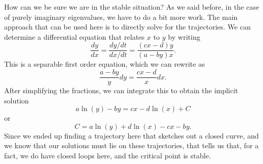 \documentclass{ximera}
\begin{document}
How can we be sure we are in the stable situation? As we said before, in the case of purely imaginary eigenvalues, we have to do a bit more work. The main approach that can be used here is to directly solve for the trajectories. We can determine a differential equation that relates $x$ to $y$ by writing
\begin{equation*}
    \frac{dy}{dx} = \frac{dy/dt}{dx/dt} = \frac{(cx-d)y}{(a-by)x}.
\end{equation*}
This is a separable first order equation, which we can rewrite as
\begin{equation*}
    \frac{a-by}{y} dy = \frac{cx-d}{x} dx.
\end{equation*}
After simplifying the fractions, we can integrate this to obtain the implicit solution
\begin{equation*}
    a\ln(y) - by = cx - d\ln(x) + C
\end{equation*}
or
\begin{equation} \label{eq:predPreyTraj} 
    C = a\ln(y) + d\ln(x) - cx - by.
\end{equation}
Since we ended up finding a trajectory here that sketches out a closed curve, and we know that our solutions must lie on these trajectories, that tells us that, for a fact, we do have closed loops here, and the critical point is stable. 
\end{document}
